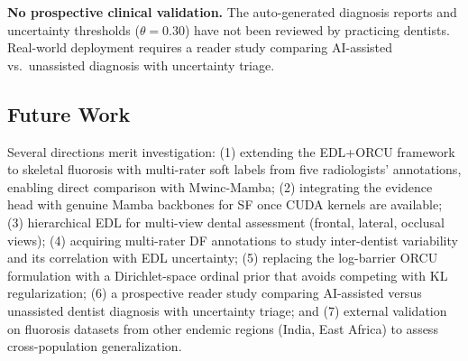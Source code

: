 \textbf{No prospective clinical validation.} The auto-generated diagnosis reports and uncertainty thresholds ($\theta = 0.30$) have not been reviewed by practicing dentists. Real-world deployment requires a reader study comparing AI-assisted vs.\ unassisted diagnosis with uncertainty triage.

\subsection{Future Work}

Several directions merit investigation: (1) extending the EDL+ORCU framework to skeletal fluorosis with multi-rater soft labels from five radiologists' annotations, enabling direct comparison with Mwinc-Mamba; (2) integrating the evidence head with genuine Mamba backbones for SF once CUDA kernels are available; (3) hierarchical EDL for multi-view dental assessment (frontal, lateral, occlusal views); (4) acquiring multi-rater DF annotations to study inter-dentist variability and its correlation with EDL uncertainty; (5) replacing the log-barrier ORCU formulation with a Dirichlet-space ordinal prior that avoids competing with KL regularization; (6) a prospective reader study comparing AI-assisted versus unassisted dentist diagnosis with uncertainty triage; and (7) external validation on fluorosis datasets from other endemic regions (India, East Africa) to assess cross-population generalization.
